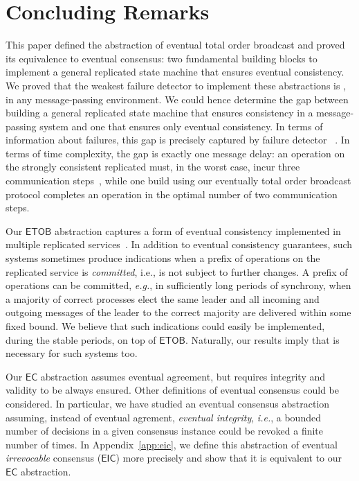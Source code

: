 \documentclass[11pt]{article}
\newcommand{\EC}{\ensuremath{\mathsf{EC}}}
\newcommand{\EIC}{\ensuremath{\mathsf{EIC}}}
\newcommand{\ETOB}{\ensuremath{\mathsf{ETOB}}}
\begin{document}
\section{Concluding Remarks}

\label{sec:conclu}



This paper defined the abstraction of eventual total order broadcast and proved its
equivalence to eventual consensus: two fundamental building
blocks to implement a general replicated state machine that ensures eventual consistency.
We proved that the weakest failure detector to implement
these abstractions is , in any message-passing environment.
We could hence determine the gap between
building a general replicated state machine that ensures consistency in a message-passing system and one
that ensures only eventual consistency.
In terms of information about failures, this gap is precisely captured
by failure detector ~\cite{DFG10}. In terms of time
complexity, the gap is exactly one message delay: an operation on the strongly
consistent replicated must, in the worst case, incur three
communication steps~\cite{Lam06}, while one build using our eventually total order 
broadcast protocol  completes an operation in the optimal number of two communication steps.


Our {\ETOB} abstraction captures a form of eventual consistency
implemented in multiple replicated
services~\cite{DeCandia2007,Cooper2008,Chang2008}. In addition  to
eventual consistency guarantees, such systems sometimes produce
indications when a prefix of operations on the replicated service is
\emph{committed}, i.e., is not subject to further changes.
A prefix of operations can be committed, \emph{e.g.}, in sufficiently
long periods of synchrony, when a majority of correct processes elect
the same leader and  all incoming and outgoing messages of
the leader to the correct majority are delivered within some fixed bound.
We believe that such indications could easily be implemented, during
the stable periods, on top of {\ETOB}. 
Naturally, our results imply that  is necessary for such systems too. 

Our {\EC} abstraction assumes eventual agreement, but requires
integrity and validity to be always ensured.
Other definitions of eventual consensus could be considered. In
particular, we have studied an eventual
consensus abstraction assuming, instead of eventual agrement, \emph{eventual integrity}, \emph{i.e.}, a bounded number of decisions
in a given consensus instance could be revoked a finite
number of times. In Appendix~\ref{app:eic}, 
we define this abstraction 
of eventual \emph{irrevocable} consensus  (\EIC) more precisely and show 
that it is equivalent to our  {\EC} abstraction.
\end{document}
